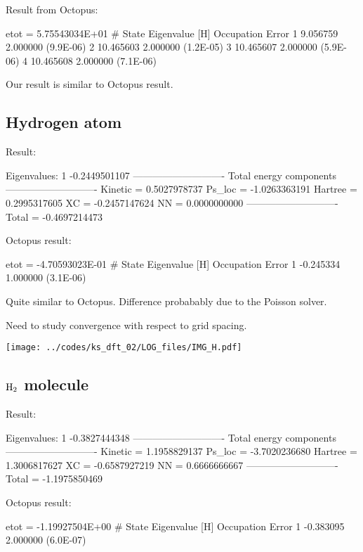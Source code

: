 Result from Octopus:
\begin{textcode}
etot  =  5.75543034E+01
#  State  Eigenvalue [H]  Occupation    Error
      1        9.056759    2.000000   (9.9E-06)
      2       10.465603    2.000000   (1.2E-05)
      3       10.465607    2.000000   (5.9E-06)
      4       10.465608    2.000000   (7.1E-06) 
\end{textcode}

Our result is similar to Octopus result.


\subsection{Hydrogen atom}

Result:
\begin{textcode}
Eigenvalues:
 1      -0.2449501107
----------------------------
Total energy components
----------------------------
Kinetic =       0.5027978737
Ps_loc  =      -1.0263363191
Hartree =       0.2995317605
XC      =      -0.2457147624
NN      =       0.0000000000
----------------------------
Total   =      -0.4697214473
\end{textcode}

Octopus result:
\begin{textcode}
 etot  = -4.70593023E-01
  #  State  Eigenvalue [H]  Occupation    Error
       1       -0.245334    1.000000   (3.1E-06)
\end{textcode}

Quite similar to Octopus.
Difference probabably due to the Poisson solver.

Need to study convergence with respect to grid spacing.

{\centering
\texttt{[image: ../codes/ks\_dft\_02/LOG\_files/IMG\_H.pdf]}
}

\subsection{$\ce{H2}$ molecule}

Result:
\begin{textcode}
Eigenvalues:
 1      -0.3827444348
----------------------------
Total energy components
----------------------------
Kinetic =       1.1958829137
Ps_loc  =      -3.7020236680
Hartree =       1.3006817627
XC      =      -0.6587927219
NN      =       0.6666666667
----------------------------
Total   =      -1.1975850469
\end{textcode}

Octopus result:
\begin{textcode}
 etot  = -1.19927504E+00
#  State  Eigenvalue [H]  Occupation    Error
      1       -0.383095    2.000000   (6.0E-07) 
\end{textcode}

